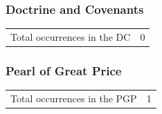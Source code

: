 	\subsubsection{Doctrine and Covenants} %
		\label{CONDESCENSION-DC}
	
		\begin{tabular}{ll}
			Total occurrences in the DC & 0
		\end{tabular}
		
		
	\subsubsection{Pearl of Great Price} %
		\label{CONDESCENSION-PGP}
	
		\begin{tabular}{ll}
			Total occurrences in the PGP & 1
		\end{tabular}
		
		\begin{compactdesc}
			\item[JS-H Note 5]
		\end{compactdesc}
		

	



